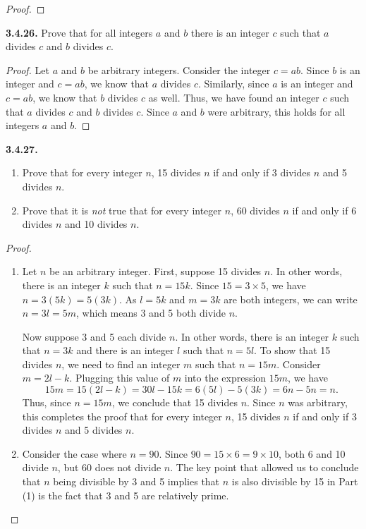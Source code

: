 \documentclass[12pt]{amsart}
\newenvironment{statement}[1]{\smallskip\noindent\color[rgb]{.6627, .3529, .6314} {\bf #1.}}{}
\theoremstyle{definition}
\theoremstyle{remark}
\begin{document}
\begin{proof}
\end{proof}


\begin{statement}{3.4.26}
Prove that for all integers $a$ and $b$ there is an integer $c$ such that $a$ divides $c$ and $b$ divides $c$.
\end{statement}

\begin{proof}
Let $a$ and $b$ be arbitrary integers.
Consider the integer $c = ab$.
Since $b$ is an integer and $c = ab$, we know that $a$ divides $c$.
Similarly, since $a$ is an integer and $c = ab$, we know that $b$ divides $c$ as well. 
Thus, we have found an integer $c$ such that $a$ divides $c$ and $b$ divides $c$.
Since $a$ and $b$ were arbitrary, this holds for all integers $a$ and $b$.
\end{proof}


\begin{statement}{3.4.27}
\begin{enumerate}
	\item Prove that for every integer $n$, 15 divides $n$ if and only if
	3 divides $n$ and 5 divides $n$.
	
	\item Prove that it is \emph{not} true that for every integer $n$,
	60 divides $n$ if and only if 6 divides $n$ and 10 divides $n$.
\end{enumerate}
\end{statement}

\begin{proof}
\hfill
\begin{enumerate}
	\item Let $n$ be an arbitrary integer.
	First, suppose 15 divides $n$.
	In other words, there is an integer $k$ such that $n = 15k$.
	Since $15 = 3 \times 5$, we have $n = 3(5k) = 5(3k)$.
	As $l = 5k$ and $m = 3k$ are both integers, we can write $n = 3l = 5m$,
	which means 3 and 5 both divide $n$.
	
	Now suppose 3 and 5 each divide $n$.
	In other words, there is an integer $k$ such that $n = 3k$
	and there is an integer $l$ such that $n = 5l$.
	To show that 15 divides $n$, we need to find an integer $m$ such that $n = 15m$.
	Consider $m = 2l - k$.
	Plugging this value of $m$ into the expression $15m$, we have
	\begin{equation*}
		15m = 15(2l - k) = 30l - 15k = 6(5l) - 5(3k) = 6n - 5n = n.
	\end{equation*}
	Thus, since $n = 15m$, we conclude that 15 divides $n$.
	Since $n$ was arbitrary, this completes the proof that for every integer $n$,
	15 divides $n$ if and only if 3 divides $n$ and 5 divides $n$.
	
	\item Consider the case where $n = 90$.
	Since $90 = 15 \times 6 = 9 \times 10$, both 6 and 10 divide $n$, but 60 does not divide $n$.
	The key point that allowed us to conclude that $n$ being divisible by 3 and 5 implies that $n$
	is also divisible by 15 in Part (1) is the fact that 3 and 5 are relatively prime.
\end{enumerate}
\end{proof}
\end{document}

